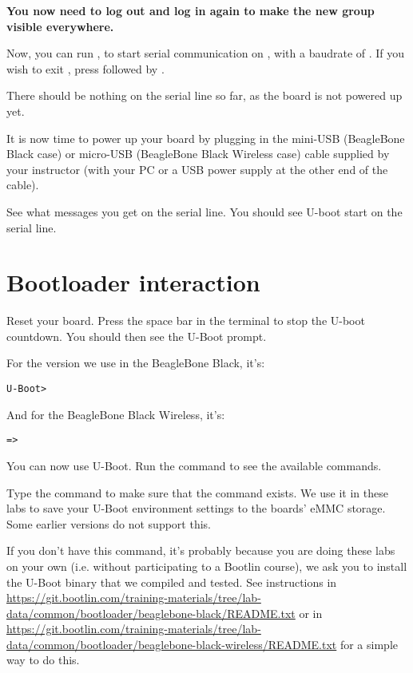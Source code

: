 {\bf You now need to log out and log in again to make the new group
visible everywhere.}

Now, you can run , to start serial
communication on , with a baudrate of . If
you wish to exit , press \code{[Ctrl][a]} followed by
\code{[Ctrl][x]}.

There should be nothing on the serial line so far, as the board is not
powered up yet.

It is now time to power up your board by plugging in the mini-USB
(BeagleBone Black case) or micro-USB (BeagleBone Black Wireless case)
cable supplied by your instructor (with your PC or a USB power supply at the
other end of the cable).

See what messages you get on the serial line. You should see U-boot
start on the serial line.

\section{Bootloader interaction}

Reset your board. Press the space bar in the  terminal
to stop the U-boot countdown. You should then see the U-Boot prompt.

For the version we use in the BeagleBone Black, it's:
\begin{verbatim}
U-Boot>
\end{verbatim}

And for the BeagleBone Black Wireless, it's:
\begin{verbatim}
=>
\end{verbatim}

You can now use U-Boot. Run the  command to see the available
commands.

Type the  command to make sure that the
 command exists. We use it in these labs to
save your U-Boot environment settings to the boards' eMMC storage.
Some earlier versions do not support this.

If you don't have this command, it's probably because you are doing these labs on your own
(i.e. without participating to a Bootlin course), we ask you to install the U-Boot binary
that we compiled and tested. See instructions in
\url{https://git.bootlin.com/training-materials/tree/lab-data/common/bootloader/beaglebone-black/README.txt}
or in
\url{https://git.bootlin.com/training-materials/tree/lab-data/common/bootloader/beaglebone-black-wireless/README.txt}
for a simple way to do this.

